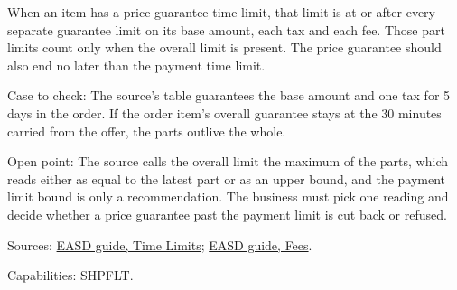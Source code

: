 \begin{theorem}
  \label{thm:offers-guarantee-limits-nest}
  \notready
  When an item has a price guarantee time limit, that limit is at or after
  every separate guarantee limit on its base amount, each tax and each fee.
  Those part limits count only when the overall limit is present. The price
  guarantee should also end no later than the payment time limit.

  Case to check: The source's table guarantees the base amount and one tax
  for 5 days in the order. If the order item's overall guarantee stays at
  the 30 minutes carried from the offer, the parts outlive the whole.

  Open point: The source calls the overall limit the maximum of the parts,
  which reads either as equal to the latest part or as an upper bound, and
  the payment limit bound is only a recommendation. The business must pick
  one reading and decide whether a price guarantee past the payment limit is
  cut back or refused.

  Sources: \href{https://standards.atlassian.net/wiki/spaces/EASD/pages/574423066/Time+Limits}{EASD guide, Time Limits};
  \href{https://standards.atlassian.net/wiki/spaces/EASD/pages/574914636/Fees}{EASD guide, Fees}.

  Capabilities: SHPFLT.
\end{theorem}


